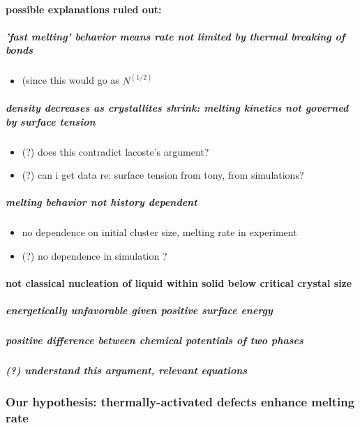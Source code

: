 \documentclass{article}
\begin{document}
\paragraph{possible explanations ruled out:}
\label{sec-2.1.2.4}
\subparagraph{'fast melting' behavior means rate not limited by thermal breaking of bonds}
\label{sec-2.1.2.4.1}
\begin{itemize}

\item (since this would go as $N^(1/2)$\\
\label{sec-2.1.2.4.1.1}%
\end{itemize} %
\subparagraph{density decreases as crystallites shrink: melting kinetics not governed by surface tension}
\label{sec-2.1.2.4.2}
\begin{itemize}

\item (?) does this contradict lacoste's argument?\\
\label{sec-2.1.2.4.2.1}%
\item (?) can i get data re: surface tension from tony, from simulations?\\
\label{sec-2.1.2.4.2.2}%
\end{itemize} %
\subparagraph{melting behavior not history dependent}
\label{sec-2.1.2.4.3}
\begin{itemize}

\item no dependence on initial cluster size, melting rate in experiment\\
\label{sec-2.1.2.4.3.1}%
\item (?) no dependence in simulation ?\\
\label{sec-2.1.2.4.3.2}%
\end{itemize} %
\paragraph{not classical nucleation of liquid within solid below critical crystal size}
\label{sec-2.1.2.5}
\subparagraph{energetically unfavorable given positive surface energy}
\label{sec-2.1.2.5.1}
\subparagraph{positive difference between chemical potentials of two phases}
\label{sec-2.1.2.5.2}
\subparagraph{(?) understand this argument, relevant equations}
\label{sec-2.1.2.5.3}
\subsubsection{Our hypothesis:  thermally-activated defects enhance melting rate}
\label{sec-2.1.3}
\end{document}
